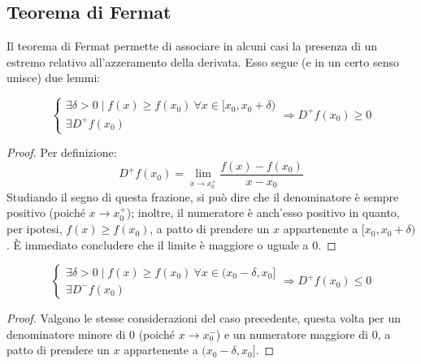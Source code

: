 \subsection{Teorema di Fermat}
Il teorema di Fermat permette di associare in alcuni casi la presenza di un estremo relativo all'azzeramento della derivata. Esso segue (e in un certo senso unisce) due lemmi:
\begin{lemma}
	\label{fermat:lemma1}
	\[
		\begin{cases}
			\exists\delta>0\mid f(x)\geq f(x_0)~\forall x\in[x_0,x_0+\delta) \\
			\exists D^+f(x_0)
		\end{cases}\Rightarrow
		D^+f(x_0)\geq0
	\]
\end{lemma}
\begin{proof}
	Per definizione:
	\[
		D^+f(x_0)=\lim_{x\to x_0^+}\frac{f(x)-f(x_0)}{x-x_0}
	\]
	Studiando il segno di questa frazione, si può dire che il denominatore è sempre positivo (poiché $x\to x_0^+$); inoltre, il numeratore è anch'esso positivo in quanto, per ipotesi, $f(x)\geq f(x_0)$, a patto di prendere un $x$ appartenente a $[x_0,x_0+\delta)$. È immediato concludere che il limite è maggiore o uguale a $0$.
\end{proof}
\begin{lemma}
	\label{fermat:lemma2}
	\[
		\begin{cases}
			\exists\delta>0\mid f(x)\geq f(x_0)~\forall x\in(x_0-\delta,x_0] \\
			\exists D^-f(x_0)
		\end{cases}\Rightarrow
		D^+f(x_0)\leq0
	\]
\end{lemma}
\begin{proof}
	Valgono le stesse considerazioni del caso precedente, questa volta per un denominatore minore di $0$ (poiché $x\to x_0^-$) e un numeratore maggiore di $0$, a patto di prendere un $x$ appartenente a $(x_0-\delta,x_0]$.
\end{proof}

